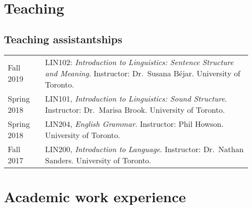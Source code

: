 \documentclass[letterpaper]{article}
\begin{document}
\section*{Teaching}

\subsection*{Teaching assistantships}

\begin{tabular}{p{}p{}}
    Fall 2019 & LIN102: \emph{Introduction to Linguistics: Sentence Structure
    and Meaning}. Instructor: Dr.~Susana B\'ejar. University of Toronto. \\
    Spring 2018 & LIN101, \emph{Introduction to Linguistics: Sound Structure}.
    Instructor: Dr.~Marisa Brook. University of Toronto. \\
    Spring 2018 & LIN204, \emph{English Grammar}. Instructor: Phil Howson.
    University of Toronto. \\
    Fall 2017 & LIN200, \emph{Introduction to Language}. Instructor: Dr.~Nathan
    Sanders. University of Toronto. \\
\end{tabular}


\section*{Academic work experience}
\end{document}
